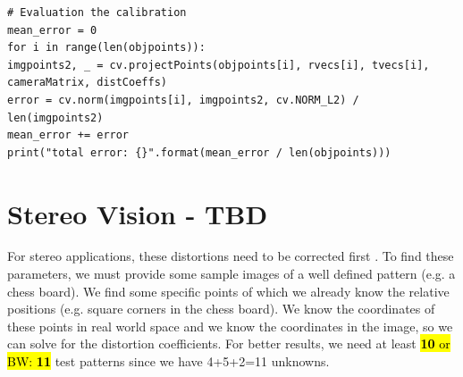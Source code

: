 \documentclass{article}
\begin{document}
\lstset{language=Python}
\lstset{frame=lines}
\lstset{basicstyle=\footnotesize}
\begin{lstlisting}
# Evaluation the calibration
mean_error = 0
for i in range(len(objpoints)):
imgpoints2, _ = cv.projectPoints(objpoints[i], rvecs[i], tvecs[i], cameraMatrix, distCoeffs)
error = cv.norm(imgpoints[i], imgpoints2, cv.NORM_L2) / len(imgpoints2)
mean_error += error
print("total error: {}".format(mean_error / len(objpoints)))
\end{lstlisting}

\section{Stereo Vision - TBD}
\label{sec:stereo_vision}
For stereo applications, these distortions need to be corrected first \cite{ref_OpenCV_camera_calibration}. To find these parameters, we must provide some sample images of a well defined pattern (e.g. a chess board). We find some specific points of which we already know the relative positions (e.g. square corners in the chess board). We know the coordinates of these points in real world space and we know the coordinates in the image, so we can solve for the distortion coefficients. For better results, we need at least \hl{\textbf{10} or BW: \textbf{11}} test patterns since we have 4+5+2=11 unknowns.




\end{document}
